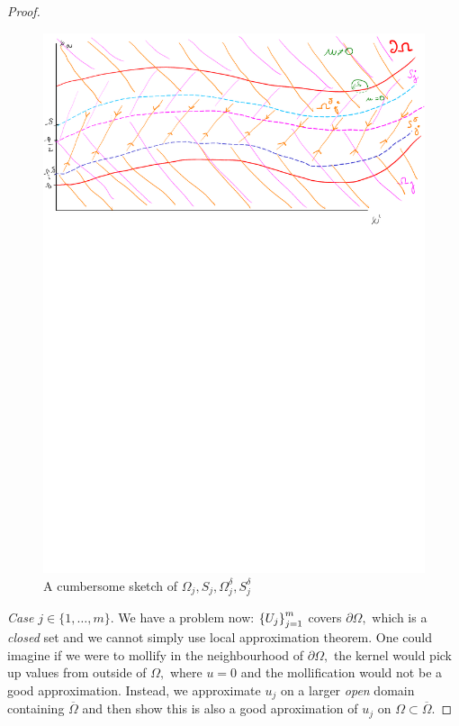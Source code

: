 \documentclass{article}
\begin{document}
\begin{proof}
\begin{figure}
  \begin{center}
	  \includegraphics[width=\linewidth]{figures/mollification.pdf}
	  \caption{A cumbersome sketch of $\Omega_j, S_j, \Omega_j^{\delta}, S_j^{\delta}$}
	  \label{fig:mollification}
  \end{center}
\end{figure}

	\textit{Case $j \in \{1,\dots,m\} $}.
	We have a problem now: $\qty{U_j}_{j=1}^m$ covers $\partial \Omega,$ which is a \textit{closed} set and we cannot simply use local approximation theorem. One could imagine if we were to mollify in the neighbourhood of $\partial \Omega,$ the kernel would pick up values from outside of $\Omega,$ where $u=0$ and the mollification would not be a good approximation. Instead, we approximate $u_j$ on a larger \textit{open} domain containing $\overline{\Omega}$ and then show this is also a good aproximation of $u_j$ on $\Omega \subset \overline{\Omega}.$


\end{proof}
\end{document}
